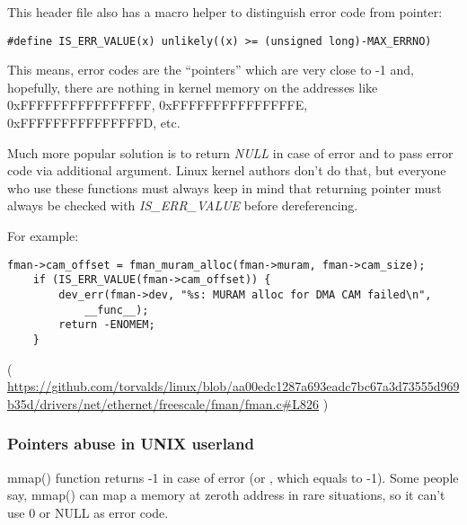 This header file also has a macro helper to distinguish error code from pointer:

\begin{lstlisting}[style=customc]
#define IS_ERR_VALUE(x) unlikely((x) >= (unsigned long)-MAX_ERRNO)
\end{lstlisting}

This means, error codes are the ``pointers'' which are very close to -1 and, hopefully, there are nothing in kernel memory
on the addresses like 0xFFFFFFFFFFFFFFFF, 0xFFFFFFFFFFFFFFFE, 0xFFFFFFFFFFFFFFFD, etc.

Much more popular solution is to return \emph{NULL} in case of error and to pass error code via additional argument.
Linux kernel authors don't do that, but everyone who use these functions must always keep in mind that returning pointer
must always be checked with \emph{IS\_ERR\_VALUE} before dereferencing.

For example:

\begin{lstlisting}[style=customc]
	fman->cam_offset = fman_muram_alloc(fman->muram, fman->cam_size);
	if (IS_ERR_VALUE(fman->cam_offset)) {
		dev_err(fman->dev, "%s: MURAM alloc for DMA CAM failed\n",
			__func__);
		return -ENOMEM;
	}
\end{lstlisting}

( \url{https://github.com/torvalds/linux/blob/aa00edc1287a693eadc7bc67a3d73555d969b35d/drivers/net/ethernet/freescale/fman/fman.c#L826} )

\subsubsection{Pointers abuse in UNIX userland}

mmap() function returns -1 in case of error (or , which equals to -1).
Some people say, mmap() can map a memory at zeroth address in rare situations, so it can't use 0 or NULL as error code.

